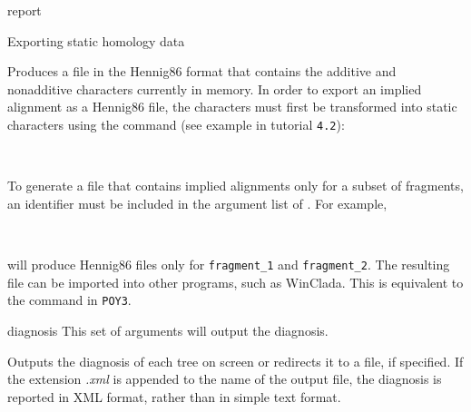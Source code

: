 \begin{command}{report}{}
\begin{arguments}
\begin{argumentgroup}{Exporting static homology data}
                {Produces a file in the Hennig86 format that contains the
                additive and nonadditive characters currently in memory.  In
                order to export an implied alignment as a Hennig86 file, the
                characters must first be transformed into static characters
                using the  command (see example in tutorial \texttt{4.2}): 
                \begin{flushleft}
                     \\
                \end{flushleft}}
                {}
	\begin{statement}
	      To generate a file that contains implied
                alignments only for a subset of fragments, an identifier must be
                included in the argument list of . For
                example, 
                \begin{flushleft}
                 \\
                \end{flushleft}
                will produce Hennig86 files only for
                \texttt{fragment\_1} and \texttt {fragment\_2}. The resulting file can be imported into other programs,
                such as WinClada.  This is equivalent to the
                 command in \texttt{POY3}.
	\end{statement}
	
		\end{argumentgroup}

		\begin{argumentgroup}{diagnosis}
			{This set of arguments will output the diagnosis.} 

                {Outputs the diagnosis of each tree on screen or redirects it to a file, if
                specified. If the extension \emph{.xml} is appended to the name of the
                output file, the diagnosis is reported in XML format, rather than in
                simple text format.} 
                {}

		\end{argumentgroup} 


\end{arguments}
\end{command}
